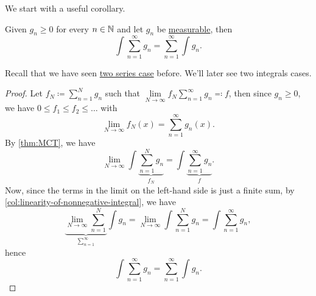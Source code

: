 We start with a useful corollary.
\begin{corollary}\label{col:Tonelli-theorem-for-nonnegative-series-and-integrals}
	Given \(g_{n}\geq 0\) for every \(n\in\mathbb{\MakeUppercase{n}} \) and let \(g_{n}\) be \hyperref[def:measurable-function]{measurable}, then
	\[
		\int \sum\limits_{n=1}^{\infty} g_{n} = \sum\limits_{n=1}^{\infty} \int g_{n}.
	\]
\end{corollary}
\begin{remark}
	Recall that we have seen \hyperref[thm:Tonelli-theorem-for-series]{two series case} before. We'll later see two integrals cases.
\end{remark}
\begin{proof}
	Let \(f_{N} \coloneqq \sum\limits_{n=1}^{N} g_{n}\) such that \(\lim\limits_{N \to \infty} f_{N} \sum\limits_{n=1}^{\infty} g_{n} \eqqcolon f\), then since \(g_{n}\geq 0\), we have \(0\leq f_{1}\leq f_{2}\leq \ldots  \) with
	\[
		\lim\limits_{N \to \infty} f_{N}(x) = \sum\limits_{n=1}^{\infty} g_{n}(x).
	\]
	By \autoref{thm:MCT}, we have
	\[
		\lim\limits_{N \to \infty} \int \underbrace{\sum\limits_{n=1}^N g_{n}}_{f_{N}} = \int \underbrace{\sum\limits_{n=1}^{\infty} g_{n }}_{f}.
	\]
	Now, since the terms in the limit on the left-hand side is just a finite sum, by \autoref{col:linearity-of-nonnegative-integral}, we have
	\[
		\underbrace{\lim\limits_{N \to \infty} \sum\limits_{n=1}^{N}}_{\sum\limits_{n=1}^{\infty} } \int g_{n} =\lim\limits_{N \to \infty} \int \sum\limits_{n=1}^N g_{n} = \int \sum\limits_{n=1}^{\infty} g_{n},
	\]
	hence
	\[
		\int \sum\limits_{n=1}^{\infty} g_{n} = \sum\limits_{n=1}^{\infty} \int g_{n}.
	\]
\end{proof}

